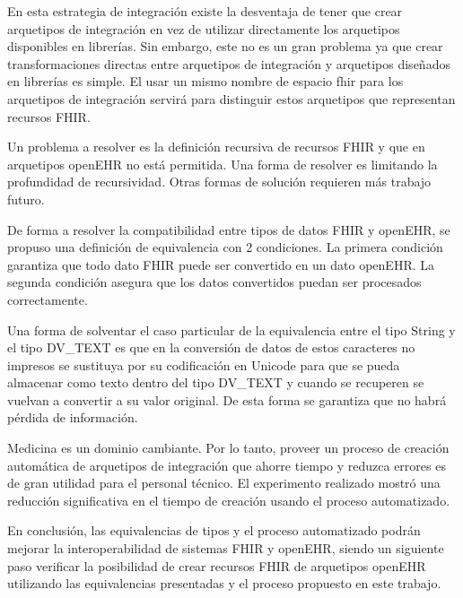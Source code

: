 En esta estrategia de integración existe la desventaja de tener que crear arquetipos de integración en vez de utilizar directamente los arquetipos disponibles en librerías. Sin embargo, este no es un gran problema ya que crear transformaciones directas entre arquetipos de integración y arquetipos diseñados en librerías es simple. El usar un mismo nombre de espacio fhir para los arquetipos de integración servirá para distinguir estos arquetipos que representan recursos FHIR.

Un problema a resolver es la definición recursiva de recursos FHIR y que en arquetipos openEHR no está permitida. Una forma de resolver es limitando la profundidad de recursividad. Otras formas de solución requieren más trabajo futuro.

De forma a resolver la compatibilidad entre tipos de datos FHIR y openEHR, se propuso una definición de equivalencia con 2 condiciones. La primera condición garantiza que todo dato FHIR puede ser convertido en un dato openEHR. La segunda condición asegura que los datos convertidos puedan ser procesados correctamente.

Una forma de solventar el caso particular de la equivalencia entre el tipo String y el tipo DV\_TEXT es que en la conversión de datos de estos caracteres no impresos se sustituya por su codificación en Unicode para que se pueda almacenar como texto dentro del tipo DV\_TEXT y cuando se recuperen se vuelvan a convertir a su valor original. De esta forma se garantiza que no habrá pérdida de información.

Medicina es un dominio cambiante. Por lo tanto, proveer un proceso de creación automática de arquetipos de integración que ahorre tiempo y reduzca errores es de gran utilidad para el personal técnico. El experimento realizado mostró una reducción significativa en el tiempo de creación usando el proceso automatizado.

En conclusión, las equivalencias de tipos y el proceso automatizado podrán mejorar la interoperabilidad de sistemas FHIR y openEHR, siendo un siguiente paso verificar la posibilidad de crear recursos FHIR de arquetipos openEHR utilizando las equivalencias presentadas y el proceso propuesto en este trabajo.
